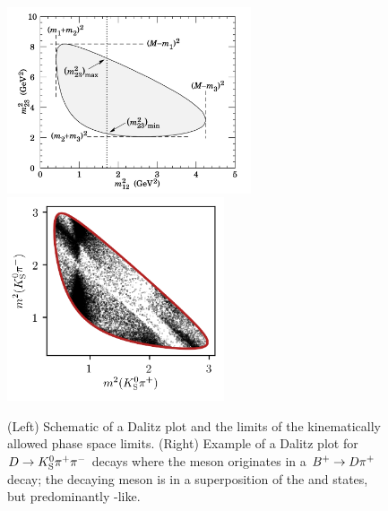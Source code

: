 \begin{figure}[tb]
    \centering
    \includegraphics[height=5.5cm,valign=t]{figures/theory/Dalitz_definitions.png}
    \includegraphics[height=6cm,valign=t]{figures/theory/single_DP_Pi_PiPi_LL_plus.png}
    \caption{(Left) Schematic of a Dalitz plot and the limits of the kinematically allowed phase space limits. (Right) Example of a Dalitz plot for ${D}\rightarrow{\ensuremath{{K}^0_{\mathrm{S}}}}{\ensuremath{{\pi}^+}}{\ensuremath{{\pi}^-}}$ decays where the \D meson originates in a ${{{B}^+}}\rightarrow{\ensuremath{D}}{\ensuremath{{\pi}^+}}$ decay; the decaying \D meson is in a superposition of the \Dz and \Dzb states, but predominantly \Dzb-like.}
    \label{fig:Dalitz_plot}
\end{figure}

